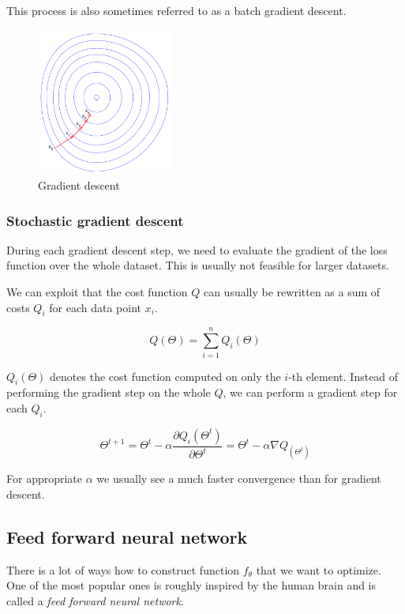     This process is also sometimes referred to as a batch gradient descent.

    \begin{figure}
    \centerline{\includegraphics[width=0.4\textwidth]{images/gradient_descent}}
    \caption[Gradient descent]{Gradient descent \cite{pict}}
    \label{obr:gradient}
    \end{figure}
    
    \subsubsection{Stochastic gradient descent}
    
    During each gradient descent step, we need to evaluate the gradient of the loss function over the whole dataset.
    This is usually not feasible for larger datasets. 
    
    We can exploit that the cost function $Q$ can usually be rewritten as a sum of costs $Q_i$ for each data point $x_i$.
    
    $$Q(\Theta) = \sum_{i=1}^n Q_i(\Theta)$$
    
    $Q_i(\Theta)$ denotes the cost function computed on only the $i$-th element. 
    Instead of performing the gradient step on the whole $Q$, 
    we can perform a gradient step for each $Q_i$. 

    $$\Theta^{t+1} = \Theta^t - \alpha \frac{\partial Q_i(\Theta^t)}{\partial \Theta^t} = \Theta^t - \alpha \nabla Q_(\Theta^t)$$
    
    For appropriate $\alpha$ we usually see a much faster convergence than for gradient descent.
    
    \subsection{Feed forward neural network}
    There is a lot of ways how to construct function $f_\theta$ that we want to optimize. 
    One of the most popular ones is roughly inspired by the human brain and is called a \textit{feed forward neural network}.
    
